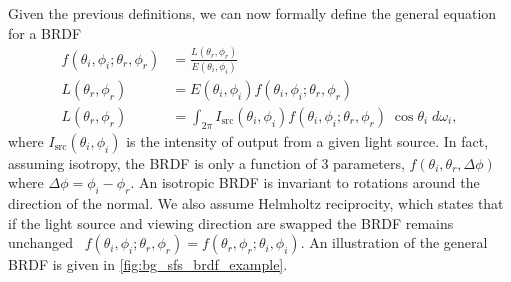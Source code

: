 Given the previous definitions, we can now formally define the general equation
for a BRDF
\begin{align}\label{eg:bg_sfs_general_brdf}
	f(\theta_i,\phi_i;\theta_r,\phi_r) &= \frac{L(\theta_r,\phi_r)}{E(\theta_i,\phi_i)} \\
	L(\theta_r,\phi_r)                 &= E(\theta_i,\phi_i) f(\theta_i,\phi_i;\theta_r,\phi_r) \\
	L(\theta_r,\phi_r)                 &= \int_{2\pi} I_{\operatorname{src}}(\theta_i,\phi_i) f(\theta_i,\phi_i;\theta_r,\phi_r) \; \cos{\theta_i} \; d\omega_i,
\end{align}
where $I_{\operatorname{src}}(\theta_i,\phi_i)$ is the intensity of output
from a given light source. In fact, assuming isotropy, the BRDF is
only a function of 3 parameters, $f(\theta_i,\theta_r, \Delta \phi)$ where
$\Delta \phi = \phi_i - \phi_r$. An isotropic BRDF is invariant to rotations
around the direction of the normal. We also assume Helmholtz reciprocity, which
states that if the light source and viewing direction are swapped the BRDF
remains unchanged
\ie~$f(\theta_i,\phi_i;\theta_r,\phi_r) = f(\theta_r,\phi_r;\theta_i,\phi_i)$.
An illustration of the general BRDF is given in \cref{fig:bg_sfs_brdf_example}.
